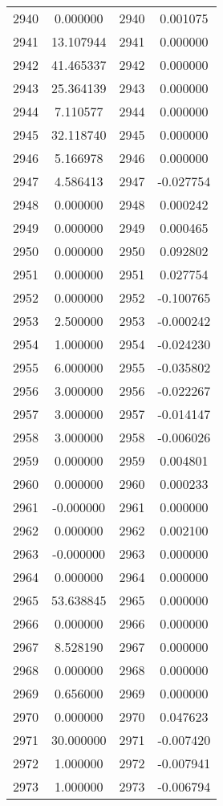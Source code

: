 \documentclass[12pt]{article}
\begin{document}
\begin{longtable}{@{}cccc@{}}
2940 & 0.000000 & 2940 & 0.001075 \\
2941 & 13.107944 & 2941 & 0.000000 \\
2942 & 41.465337 & 2942 & 0.000000 \\
2943 & 25.364139 & 2943 & 0.000000 \\
2944 & 7.110577 & 2944 & 0.000000 \\
2945 & 32.118740 & 2945 & 0.000000 \\
2946 & 5.166978 & 2946 & 0.000000 \\
2947 & 4.586413 & 2947 & -0.027754 \\
2948 & 0.000000 & 2948 & 0.000242 \\
2949 & 0.000000 & 2949 & 0.000465 \\
2950 & 0.000000 & 2950 & 0.092802 \\
2951 & 0.000000 & 2951 & 0.027754 \\
2952 & 0.000000 & 2952 & -0.100765 \\
2953 & 2.500000 & 2953 & -0.000242 \\
2954 & 1.000000 & 2954 & -0.024230 \\
2955 & 6.000000 & 2955 & -0.035802 \\
2956 & 3.000000 & 2956 & -0.022267 \\
2957 & 3.000000 & 2957 & -0.014147 \\
2958 & 3.000000 & 2958 & -0.006026 \\
2959 & 0.000000 & 2959 & 0.004801 \\
2960 & 0.000000 & 2960 & 0.000233 \\
2961 & -0.000000 & 2961 & 0.000000 \\
2962 & 0.000000 & 2962 & 0.002100 \\
2963 & -0.000000 & 2963 & 0.000000 \\
2964 & 0.000000 & 2964 & 0.000000 \\
2965 & 53.638845 & 2965 & 0.000000 \\
2966 & 0.000000 & 2966 & 0.000000 \\
2967 & 8.528190 & 2967 & 0.000000 \\
2968 & 0.000000 & 2968 & 0.000000 \\
2969 & 0.656000 & 2969 & 0.000000 \\
2970 & 0.000000 & 2970 & 0.047623 \\
2971 & 30.000000 & 2971 & -0.007420 \\
2972 & 1.000000 & 2972 & -0.007941 \\
2973 & 1.000000 & 2973 & -0.006794 \\

\end{longtable}
\end{document}
